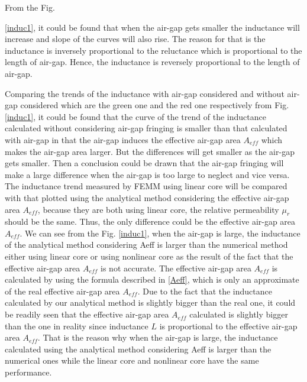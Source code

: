 \documentclass[a4paper]{IEEEtran}
\begin{document}
From the Fig. {\ref{induc1}, it could be found that when the air-gap gets smaller the inductance will increase and slope of the curves will also rise. 
The reason for that is the inductance is inversely proportional to the reluctance which is proportional to the length of air-gap.
Hence, the inductance is reversely proportional to the length of air-gap.\par

Comparing the trends of the inductance with air-gap considered and without air-gap considered which are the green one and the red one respectively from Fig. {\ref{induc1}}, 
it could be found that the curve of the trend of the inductance calculated without considering air-gap fringing is smaller than that calculated with air-gap in that the air-gap induces the effective air-gap area $A_{eff}$ which makes the air-gap area larger. 
But the differences will get smaller as the air-gap gets smaller. Then a conclusion could be drawn that the air-gap fringing will make a large difference when the air-gap is too large to neglect and vice versa.
The inductance trend measured by FEMM using linear core will be compared with that plotted using the analytical method considering the effective air-gap area $A_{eff}$,
because they are both using linear core, the relative permeability $\mu_r$ should be the same. Thus, the only difference could be the effective air-gap area $A_{eff}$. We can see from the Fig. {\ref{induc1}}, when the air-gap is large, 
the inductance of the analytical method considering Aeff is larger than the numerical method either using linear core or using nonlinear core as the result of the fact that the effective air-gap area $A_{eff}$ is not accurate. The effective air-gap area $A_{eff}$ is calculated
by using the formula described in \eqref{Aeff}, which is only an approximate of the real effective air-gap area $A_{eff}$. Due to the fact that the inductance calculated by our analytical method is slightly bigger than the real one,
it could be readily seen that the effective air-gap area $A_{eff}$ calculated is slightly bigger than the one in reality since inductance $L$ is proportional to the effective air-gap area $A_{eff}$.
That is the reason why when the air-gap is large, the inductance calculated using the analytical method considering Aeff is larger than the numerical ones while the linear core and nonlinear core have the same performance.\par
\begin{figure}[H]
\centering

\end{figure}}
\end{document}
